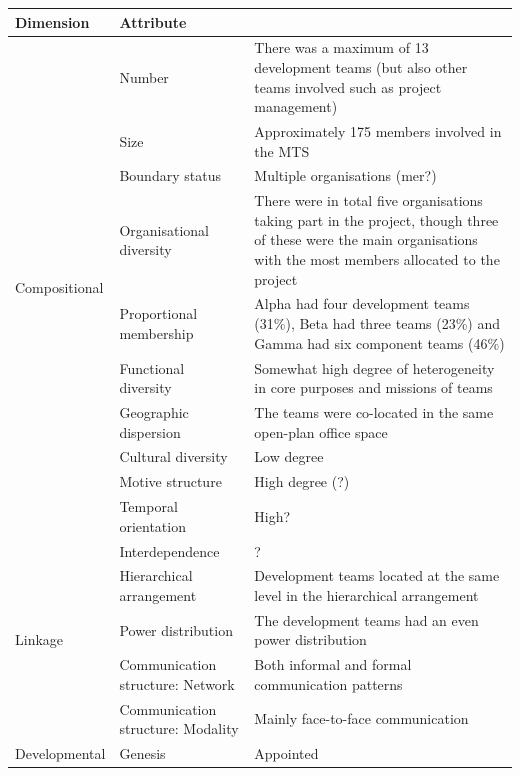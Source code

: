 \begin{table}[H]
\begin{adjustwidth}{-1.15cm}{}
\begin{tabular}{ | p{2.7cm} | p{5cm} | p{9cm} | }
	\hline
	\textbf{Dimension} & \textbf{Attribute} & \textbf{} \\ \hline
	\multirow{10}{*}{Compositional} & Number & There was a maximum of 13 development teams (but also other teams involved such as project management) \\ \cline{2-3}
 	& Size & Approximately 175 members involved in the MTS \\ \cline{2-3}
 	& Boundary status & Multiple organisations (mer?) \\ \cline{2-3}
 	& Organisational diversity & There were in total five organisations taking part in the project, though three of these were the main organisations with the most members allocated to the project \\ \cline{2-3}
	& Proportional membership & Alpha had four development teams (31\%), Beta had three teams (23\%) and Gamma had six component teams (46\%) \\ \cline{2-3}
	& Functional diversity & Somewhat high degree of heterogeneity in core purposes and missions of teams \\ \cline{2-3}
	& Geographic dispersion & The teams were co-located in the same open-plan office space \\ \cline{2-3}
	& Cultural diversity & Low degree \\ \cline{2-3}
	& Motive structure & High degree (?) \\ \cline{2-3}
	& Temporal orientation & High? \\ \cline{2-3}
\hline
	\multirow{5}{*}{Linkage} & Interdependence & ? \\ \cline{2-3}
 	& Hierarchical arrangement & Development teams located at the same level in the hierarchical arrangement \\ \cline{2-3}
 	& Power distribution & The development teams had an even power distribution \\ \cline{2-3}
	& Communication structure: Network & Both informal and formal communication patterns \\ \cline{2-3}
	& Communication structure: Modality & Mainly face-to-face communication \\ \cline{2-3}
\hline
	\multirow{6}{*}{Developmental} & Genesis & Appointed \\ \cline{2-3}

\end{tabular}
\end{adjustwidth}
\end{table}
